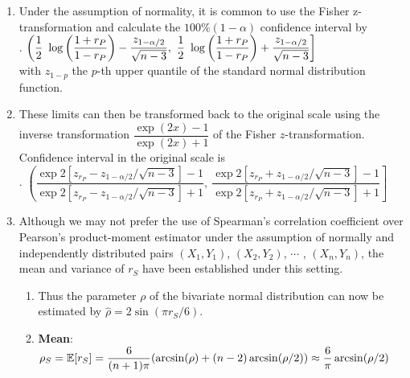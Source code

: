 \begin{enumerate}[series=binvar-normal]
    \item Under the assumption of normality, it is common to use the Fisher z-transformation and calculate the $100\%(1 - \alpha)$ confidence interval by
    \hfill \cite{statistics/book/Statistics-for-Data-Scientists/Maurits-Kaptein}
    \\[0.3cm]
    .\hfill
    $
        \left(
            \dfrac{1}{2}\ \log\left(\dfrac{1 + r_P}{ 1 - r_P}\right) - \dfrac{z_{1-\alpha/2}}{\sqrt{n - 3}} ,
            \ \dfrac{1}{2}\ \log\left(\dfrac{1 + r_P}{ 1 - r_P}\right) + \dfrac{z_{1-\alpha/2}}{\sqrt{n - 3}}
        \right ]
    $
    \hfill \cite{statistics/book/Statistics-for-Data-Scientists/Maurits-Kaptein}
    \\[0.3cm]
    with $z_{1 - p}$ the $p$-th upper quantile of the standard normal distribution function.


    \item These limits can then be transformed back to the original scale using the inverse transformation $\dfrac{\exp({2x}) - 1}{\exp({2x}) + 1}$ of the Fisher $z$-transformation.
    Confidence interval in the original scale is
    \hfill \cite{statistics/book/Statistics-for-Data-Scientists/Maurits-Kaptein}
    \\[0.3cm]
    .\hfill
    $
        \left(
            \dfrac{\exp{2[z_{r_P} - z_{1-\alpha/2}/\sqrt{n-3}]} - 1}{\exp{2[z_{r_P} - z_{1-\alpha/2}/\sqrt{n-3}]} + 1},
            \ \dfrac{\exp{2[z_{r_P} + z_{1-\alpha/2}/\sqrt{n-3}]} - 1}{\exp{2[z_{r_P} + z_{1-\alpha/2}/\sqrt{n-3}]} + 1}
        \right]
    $
    \hfill \cite{statistics/book/Statistics-for-Data-Scientists/Maurits-Kaptein}

    \item Although we may not prefer the use of Spearman’s correlation coefficient over Pearson’s product-moment estimator under the assumption of normally and independently distributed pairs $(X_1, Y_1)$, $(X_2, Y_2)$, $\cdots$ , $(X_n , Y_n )$, the mean and variance of $r_S$ have been established under this setting.
    \hfill \cite{statistics/book/Statistics-for-Data-Scientists/Maurits-Kaptein}
    \begin{enumerate}
        \item Thus the parameter $\rho$ of the bivariate normal distribution can now be estimated by $\hat{\rho} = 2 \sin(\pi r_S /6)$.
        \hfill \cite{statistics/book/Statistics-for-Data-Scientists/Maurits-Kaptein}

        \item \textbf{Mean}:
        $
            \rho_S
            = \mathbb{E}[r_S]
            = \dfrac{6}{(n + 1)\pi} (\arcsin(\rho) + (n - 2) \arcsin(\rho/2))
            \approx \dfrac{6}{\pi} \arcsin(\rho/2)
        $
        \hfill \cite{statistics/book/Statistics-for-Data-Scientists/Maurits-Kaptein}


\end{enumerate}
\end{enumerate}
